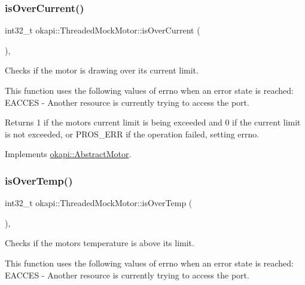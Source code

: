 \subsubsection{\texorpdfstring{isOverCurrent()}{isOverCurrent()}}
{\footnotesize\ttfamily int32\+\_\+t okapi\+::\+Threaded\+Mock\+Motor\+::is\+Over\+Current (\begin{DoxyParamCaption}{ }\end{DoxyParamCaption})\hspace{0.3cm}{\ttfamily [override]}, {\ttfamily [virtual]}}



Checks if the motor is drawing over its current limit. 

This function uses the following values of errno when an error state is reached\+: E\+A\+C\+C\+ES -\/ Another resource is currently trying to access the port.

\begin{DoxyReturn}{Returns}
1 if the motor\textquotesingle{}s current limit is being exceeded and 0 if the current limit is not exceeded, or P\+R\+O\+S\+\_\+\+E\+RR if the operation failed, setting errno. 
\end{DoxyReturn}


Implements \mbox{\hyperlink{classokapi_1_1AbstractMotor_a3d365496ebb8566c0a12611f090c5231}{okapi\+::\+Abstract\+Motor}}.

\mbox{\label{classokapi_1_1ThreadedMockMotor_a65c4c3a0efd47a3f10d91865a2f471de}} 
\subsubsection{\texorpdfstring{isOverTemp()}{isOverTemp()}}
{\footnotesize\ttfamily int32\+\_\+t okapi\+::\+Threaded\+Mock\+Motor\+::is\+Over\+Temp (\begin{DoxyParamCaption}{ }\end{DoxyParamCaption})\hspace{0.3cm}{\ttfamily [override]}, {\ttfamily [virtual]}}



Checks if the motor\textquotesingle{}s temperature is above its limit. 

This function uses the following values of errno when an error state is reached\+: E\+A\+C\+C\+ES -\/ Another resource is currently trying to access the port.

